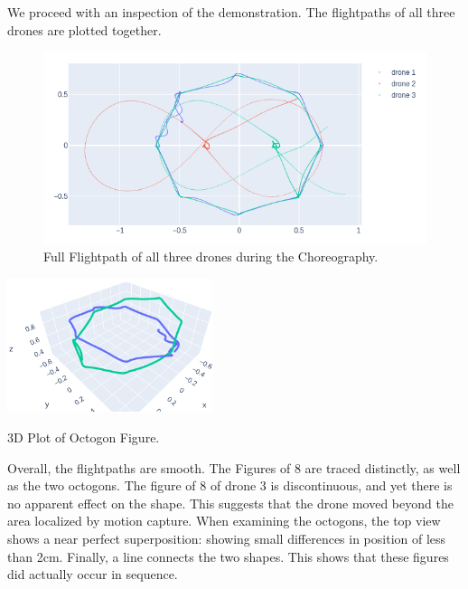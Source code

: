 We proceed with an inspection of the demonstration. The flightpaths of all three drones are plotted together.

\begin{figure}[h]
    \raggedright
    \includegraphics[width=13cm]{images/choreography/trajectory_choreography2.png}
  \caption{Full Flightpath of all three drones during the Choreography.}
\end{figure} 

\begin{marginfigure}%
  \vspace{-0.5cm}
  \includegraphics[width=6cm]{images/chore_pictures/octogon/3d2.png}
  \caption{3D Plot of Octogon Figure.}
\end{marginfigure}

Overall, the flightpaths are smooth. The Figures of 8 are traced distinctly, as well as the two octogons. The figure of 8 of drone 3 is discontinuous, and yet there is no apparent effect on the shape. This suggests that the drone moved beyond the area localized by motion capture. When examining the octogons, the top view shows a near perfect superposition: showing small differences in position of less than 2cm. Finally, a line connects the two shapes. This shows that these figures did actually occur in sequence.

